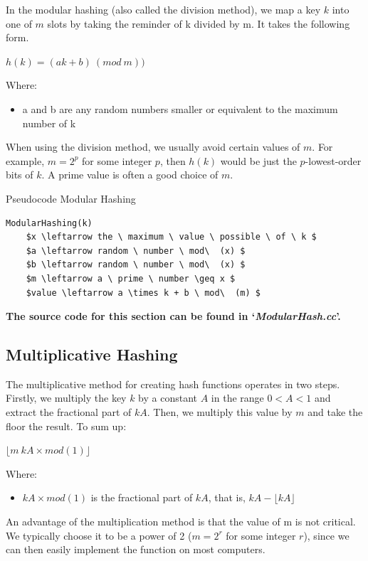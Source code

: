 \documentclass[12pt]{article}
\begin{document}
In the modular hashing (also called the division method), we map a key $k$ into one of $m$ slots by taking the reminder of k divided by m. It takes the following form. 

\begin{center} $h(k) = (ak+b)\  (mod \ m))$ \end{center}

Where: 
\begin{itemize}
\item a and b are any random numbers smaller or equivalent to the maximum number of k 
\end{itemize}

When using the division method, we usually avoid certain values of $m$. For example, $m = 2^p$ for some integer $p$, then $h(k)$ would be just the $p$-lowest-order bits of $k$. A prime value is often a good choice of $m$.

\begin{center}
\begin{large}
Pseudocode Modular Hashing
\end{large}
\end{center}

\begin{lstlisting}[mathescape=true]
ModularHashing(k)
	$x \leftarrow the \ maximum \ value \ possible \ of \ k $
	$a \leftarrow random \ number \ mod\  (x) $
	$b \leftarrow random \ number \ mod\  (x) $
	$m \leftarrow a \ prime \ number \geq x $
	$value \leftarrow a \times k + b \ mod\  (m) $

\end{lstlisting}

\textbf{The source code for this section can be found in `\textit{ModularHash.cc}'.}
\bigskip

\subsection{Multiplicative Hashing}
The multiplicative method for creating hash functions operates in two steps.
Firstly, we multiply the key $k$ by a constant $A$ in the range $0<A<1$ and extract the fractional part of $kA$. Then, we multiply this value by $m$ and take the floor the result. To sum up:  

\begin{center}
 $ \lfloor m\ kA \times mod(1)  \rfloor$
\end{center}
Where:
\begin{itemize}
\item $kA  \times mod(1)$  is the fractional part of $kA$, that is, $kA- \lfloor kA \rfloor$
\end{itemize}
An advantage of the multiplication method is that the value of m is not critical. We typically choose it to be a power of 2 ($m = 2^r$ for some integer $r$), since we can then easily implement the function on most computers.
\end{document}
